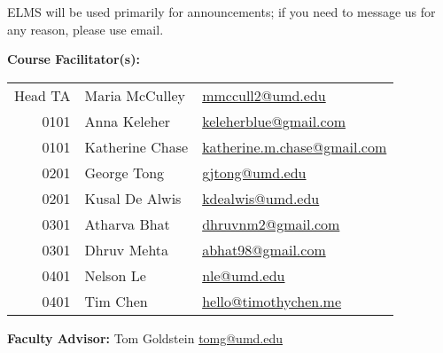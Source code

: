 \documentclass[12pt]{article}
\begin{document}
ELMS will be used primarily for announcements; if you need to message us for any reason,
please use email.

\medskip

\noindent\textbf{Course Facilitator(s): }

\begin{table}[h!]
  \begin{tabular}{@{}rll}
    Head TA & Maria McCulley  & \href{mailto:mmccull2@umd.edu}{mmccull2@umd.edu}\\
    0101    & Anna Keleher    & \href{mailto:keleherblue@gmail.com}{keleherblue@gmail.com}\\
    0101    & Katherine Chase & \href{mailto:katherine.m.chase@gmail.com}
                                {katherine.m.chase@gmail.com}\\
    0201    & George Tong     & \href{mailto:gjtong@umd.edu}{gjtong@umd.edu}\\
    0201    & Kusal De Alwis  & \href{mailto:kdealwis@umd.edu}{kdealwis@umd.edu}\\
    0301    & Atharva Bhat    & \href{mailto:dhruvnm2@gmail.com}{dhruvnm2@gmail.com}\\
    0301    & Dhruv Mehta     & \href{mailto:abhat98@gmail.com}{abhat98@gmail.com}\\
    0401    & Nelson Le       & \href{mailto:nle@umd.edu}{nle@umd.edu}\\
    0401    & Tim Chen        & \href{mailto:hello@timothychen.me}{hello@timothychen.me}
  \end{tabular}
\end{table}
\medskip

\noindent\textbf{Faculty Advisor: }Tom Goldstein
\href{mailto:tomg@umd.edu}{tomg@umd.edu} \medskip

\bigskip
\end{document}
